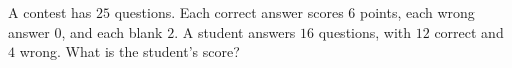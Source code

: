 A contest has $25$ questions. Each correct answer scores $6$ points, each wrong answer $0$, and each blank $2$. A student answers $16$ questions, with $12$ correct and $4$ wrong. What is the student's score?
